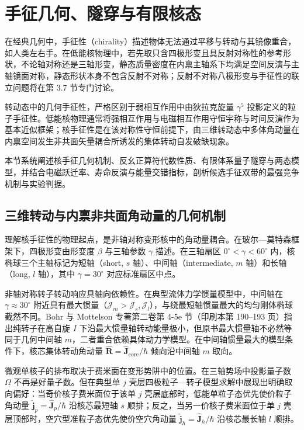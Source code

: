 \section{手征几何、隧穿与有限核态}\label{sec:3-5}

在经典几何中，手征性（chirality）描述物体无法通过平移与转动与其镜像重合，如人类左右手。在低能核物理中，若先取只含四极形变且具反射对称性的参考形状，不论轴对称还是三轴形变，静态质量密度在内禀主轴系下均满足空间反演与主轴镜面对称，静态形状本身不包含反射不对称；反射不对称八极形变与手征性的联立问题将在第 3.7 节专门讨论。

转动态中的几何手征性，严格区别于弱相互作用中由狄拉克旋量 $\gamma^5$ 投影定义的粒子手征性。低能核物理通常将强相互作用与电磁相互作用守恒宇称与时间反演作为基本近似框架；核手征性是在该对称性守恒前提下，由三维转动态中多体角动量在内禀空间发生非共面矢量耦合所诱发的集体转动自发破缺现象\cite{frauendorf-meng-1997-tilted-rotation-chirality,frauendorf-2001-spontaneous-symmetry-breaking-rotating-nuclei}。

本节系统阐述核手征几何机制、反幺正算符代数性质、有限体系量子隧穿与两态模型，并结合电磁跃迁率、寿命反演与能量交错指标，剖析候选手征双带的最强竞争机制与实验判据。

\subsection{三维转动与内禀非共面角动量的几何机制}\label{sec:3-5-1}

理解核手征性的物理起点，是非轴对称变形核中的角动量耦合。在玻尔—莫特森框架下，四极形变由形变度 $\beta$ 与三轴参数 $\gamma$ 描述。在三轴扇区 $0^\circ < \gamma < 60^\circ$ 内，核椭球三个主轴标记为短轴（short, $s$ 轴）、中间轴（intermediate, $m$ 轴）和长轴（long, $l$ 轴），其中 $\gamma = 30^\circ$ 对应标准扇区中点。

非轴对称转子转动响应具轴向依赖性。在典型流体力学惯量模型中，中间轴在 $\gamma \approx 30^\circ$ 附近具有最大惯量（$\mathcal{J}_m > \mathcal{J}_s, \mathcal{J}_l$），与绕最短轴惯量最大的均匀刚体椭球截然不同。Bohr 与 Mottelson 专著第二卷第 4-5e 节（印刷本第 190–193 页）指出纯转子在高自旋 $I$ 下沿最大惯量轴转动能量极小\cite{book-bohr-mottelson-nuclear-structure-vol2}，但原书最大惯量轴不必然等同于几何中间轴 $m$，二者重合依赖具体动力学模型。在中间轴惯量最大的模型条件下，核芯集体转动角动量 $\hat{\mathbf{R}} = \hat{\mathbf{J}}_{\text{core}} / \hbar$ 倾向沿中间轴 $m$ 取向。

微观单核子的排布取决于费米面在变形势阱中的位置。在三轴势场中投影量子数 $\Omega$ 不再是好量子数。但在典型单 $j$ 壳层四极粒子—转子模型求解中展现出明确取向偏好：当奇价核子费米面位于该单 $j$ 壳层底部时，低能单粒子态优先使价粒子角动量 $\hat{\mathbf{j}}_p = \hat{\mathbf{J}}_p / \hbar$ 沿核芯最短轴 $s$ 顺排；反之，当另一价核子费米面位于单 $j$ 壳层顶部时，空穴型准粒子态优先使价空穴角动量 $\hat{\mathbf{j}}_h = \hat{\mathbf{J}}_h / \hbar$ 沿核芯最长轴 $l$ 顺排。

